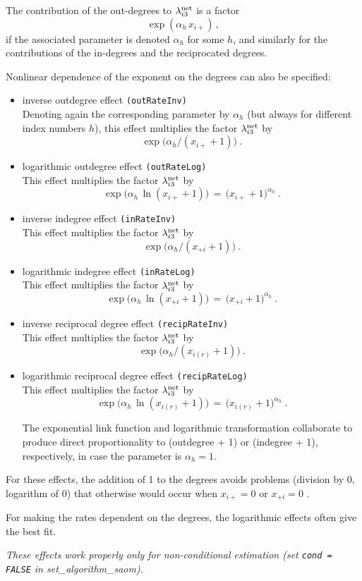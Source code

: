 \documentclass[a4paper,fleqn,11pt]{article}
\newcommand{\+}{\, + \,}
\newcommand{\sfn}[1]{\textsf{#1}}
\begin{document}
\begin{enumerate}
The contribution of the out-degrees to $\lambda^{\rm net}_{i3}$
is a factor
 \[ \exp( \alpha_h \, x_{i+})\,, \]
if the associated parameter is denoted $\alpha_h$ for some $h$,
and similarly for the contributions of the in-degrees and the
reciprocated degrees.

 Nonlinear dependence of the exponent on the degrees
 can also be specified:
 \begin{itemize}
 \item inverse outdegree effect  \texttt{(outRateInv)} \\
 Denoting again the corresponding parameter by $\alpha_h$
 (but always for different index numbers $h$),
 this effect multiplies the factor $\lambda^{\rm net}_{i3}$ by
 \[ \exp\big( \alpha_h / (x_{i+} +1)\big) \ . \]
 \item logarithmic outdegree effect  \texttt{(outRateLog)} \\
 This effect multiplies the factor $\lambda^{\rm net}_{i3}$ by
 \[ \exp\big(\alpha_h\, \ln (x_{i+} +1)\big) \,=\,
                 \big(x_{i+} +1\big)^{\alpha_h} \ . \]

 \item inverse indegree effect  \texttt{(inRateInv)} \\
 This effect multiplies the factor $\lambda^{\rm net}_{i3}$ by
 \[ \exp\big( \alpha_h / (x_{+i} +1)\big) \ . \]
 \item logarithmic indegree effect  \texttt{(inRateLog)} \\
 This effect multiplies the factor $\lambda^{\rm net}_{i3}$ by
 \[ \exp\big(\alpha_h\, \ln (x_{+i} +1) \big) \,=\,
                 \big(x_{+i} +1\big)^{\alpha_h} \ . \]


 \item inverse reciprocal degree effect  \texttt{(recipRateInv)} \\
 This effect multiplies the factor $\lambda^{\rm net}_{i3}$ by
 \[ \exp\big( \alpha_h / (x_{i(r)} +1)\big) \ . \]
 \item logarithmic reciprocal degree effect  \texttt{(recipRateLog)} \\
 This effect multiplies the factor $\lambda^{\rm net}_{i3}$ by
 \[ \exp\big(\alpha_h \, \ln(x_{i(r)} +1)\big) \,=\,
                 \big(x_{i(r)} +1\big)^{\alpha_h} \ . \]

 The exponential link function and logarithmic transformation collaborate
 to produce direct proportionality to (outdegree + 1) or (indegree + 1),
 respectively, in case the parameter is $\alpha_h=1$.
 \end{itemize}
 For these effects, the addition of 1 to the degrees avoids
 problems (division by 0, logarithm of 0) that otherwise would occur
 when $ x_{i+} = 0$ or $ x_{+i} = 0$ .

 For making the rates dependent on the degrees,
 the  logarithmic effects often give the best fit.

 \emph{These effects work properly only for non-conditional estimation
    (set \texttt{cond = FALSE} in \sfn{set\_algorithm\_saom}).  }
\end{enumerate}
\end{document}
